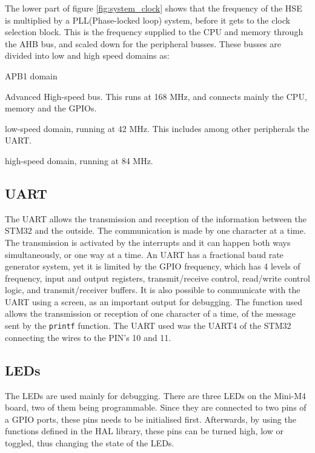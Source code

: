 The lower part of figure \ref{fig:system_clock} shows that the frequency
of the HSE is multiplied by a PLL(Phase-locked loop) system, before it gets
to the clock selection block. This is the frequency supplied to
the CPU and memory through the AHB bus, and scaled down for the peripheral busses. These busses are divided into low and high speed domains as:

\begin{labeling}{APB1 domain}
	\item[\textbf{AHB}]
		Advanced High-speed bus. This runs at 168 MHz, and connects
		mainly the CPU, memory and the GPIOs.
	\item[\textbf{APB1 domain}]
		low-speed domain, running at 42 MHz. This includes among other 
		peripherals the UART.		
	\item[\textbf{APB2 domain}]
		high-speed domain, running at 84 MHz.
	\end{labeling}

\subsection{UART}
The UART allows the transmission and reception of the information between the STM32 and the outside. The 
communication is made by one character at a time. The transmission is activated by the interrupts and it 
can happen both ways simultaneously, or one way at a time. An UART has a fractional baud rate generator 
system, yet it is limited by the GPIO frequency, which has 4 levels of frequency, input and output 
registers, transmit/receive control, read/write control logic, and transmit/receiver buffers. It is also 
possible to communicate with the UART using a screen, as an important output for debugging. The 
function used allows the transmission or reception of one character of a time, of the message sent by the 
\texttt{printf} function. The UART used was the UART4 of the STM32 connecting the wires to the PIN's 10 and 11.

\subsection{LEDs}
The LEDs are used mainly for debugging. There are three LEDs on the 
Mini-M4 board, two of them being programmable. Since they are connected
to two pins of a GPIO ports, these pins needs to be initialised first.
Afterwards, 
by using the functions defined in the HAL library, these pins can be 
turned high, low or toggled, thus changing the state of the LEDs.

